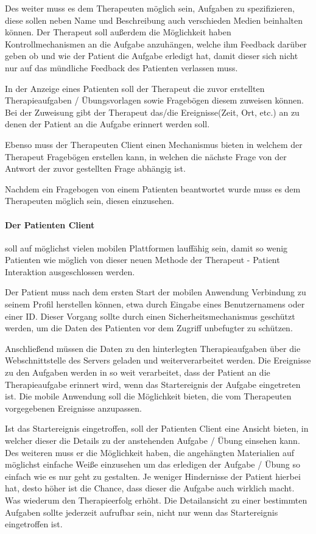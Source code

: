 Des weiter muss es dem Therapeuten möglich sein, Aufgaben zu spezifizieren, diese sollen neben Name und Beschreibung auch verschieden Medien beinhalten können. Der Therapeut soll außerdem die Möglichkeit haben Kontrollmechanismen an die Aufgabe anzuhängen, welche ihm Feedback darüber geben ob und wie der Patient die Aufgabe erledigt hat, damit dieser sich nicht nur auf das mündliche Feedback des Patienten verlassen muss.

In der Anzeige eines Patienten soll der Therapeut die zuvor erstellten Therapieaufgaben / Übungsvorlagen sowie Fragebögen diesem zuweisen können. Bei der Zuweisung gibt der Therapeut das/die Ereignisse(Zeit, Ort, etc.) an zu denen der Patient an die Aufgabe erinnert werden soll.

Ebenso muss der Therapeuten Client einen Mechanismus bieten in welchem der Therapeut Fragebögen erstellen kann, in welchen die nächste Frage von der Antwort der zuvor gestellten Frage abhängig ist.

Nachdem ein Fragebogen von einem Patienten beantwortet wurde muss es dem Therapeuten möglich sein, diesen einzusehen.



\paragraph{Der Patienten Client} soll auf möglichst vielen mobilen Plattformen lauffähig sein, damit so wenig Patienten wie möglich von dieser neuen Methode der Therapeut - Patient Interaktion ausgeschlossen werden.

Der Patient muss nach dem ersten Start der mobilen Anwendung Verbindung zu seinem Profil herstellen können, etwa durch Eingabe eines Benutzernamens oder einer ID. Dieser Vorgang sollte durch einen Sicherheitsmechanismus geschützt werden, um die Daten des Patienten vor dem Zugriff unbefugter zu schützen.

Anschließend müssen die Daten zu den hinterlegten Therapieaufgaben über die Webschnittstelle des Servers geladen und weiterverarbeitet werden. Die Ereignisse zu den Aufgaben werden in so weit verarbeitet, dass der Patient an die Therapieaufgabe erinnert wird, wenn das Startereignis der Aufgabe eingetreten ist. Die mobile Anwendung soll die Möglichkeit bieten, die vom Therapeuten vorgegebenen Ereignisse anzupassen.

Ist das Startereignis eingetroffen, soll der Patienten Client eine Ansicht bieten, in welcher dieser die Details zu der anstehenden Aufgabe / Übung einsehen kann. Des weiteren muss er die Möglichkeit haben, die angehängten Materialien auf möglichst einfache Weiße einzusehen um das erledigen der Aufgabe / Übung so einfach wie es nur geht zu gestalten. Je weniger Hindernisse der Patient hierbei hat, desto höher ist die Chance, dass dieser die Aufgabe auch wirklich macht. Was wiederum den Therapieerfolg erhöht. Die Detailansicht zu einer bestimmten Aufgaben sollte jederzeit aufrufbar sein, nicht nur wenn das Startereignis eingetroffen ist.

